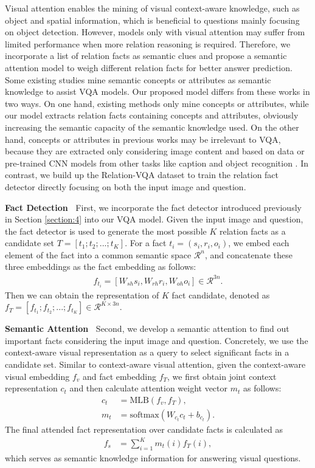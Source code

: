 \documentclass[sigconf]{acmart}
\begin{document}
Visual attention enables the mining of visual context-aware knowledge, such as object and spatial information, which is beneficial to questions mainly focusing on object detection. However, models only with visual attention may suffer from limited performance when more relation reasoning is required.
Therefore, we incorporate a list of relation facts as semantic clues and 
propose a semantic attention model to weigh different relation facts for better answer prediction. 
Some existing studies mine semantic concepts or attributes as semantic knowledge to assist VQA models. Our proposed model differs from these works in two ways. On one hand, existing methods only mine concepts or attributes, while our model extracts relation facts containing concepts and attributes, obviously increasing the semantic capacity of the semantic knowledge used. On the other hand, concepts or attributes in previous works may be irrelevant to VQA, because they are extracted only considering image content and based on data or pre-trained CNN models from other tasks like caption and object recognition \cite{yu2017multi}. 
In contrast, we build up the Relation-VQA dataset to train the relation fact detector directly focusing on both the input image and question.

\textbf{Fact Detection~} First, we incorporate the fact detector introduced previously in Section \ref{section:4} into our VQA model. Given the input image and question, the fact detector is used to generate the most possible $K$ relation facts as a candidate set $T = [t_1; t_2; ...; t_K]$. For a fact $t_i = (s_i, r_i, o_i)$, we embed each element of the fact into a common semantic space $\mathcal{R}^n$, and concatenate these three embeddings as the fact embedding as follows:
\begin{align}
	f_{t_i} = [W_{sh}s_i, W_{rh}r_i, W_{oh}o_i] \in \mathcal{R}^{3n}. 
\end{align}
Then we can obtain the representation of $K$ fact candidate, denoted as $f_T = [f_{t_1}; f_{t_2}; ...; f_{t_K}] \in \mathcal{R}^{K\times3n}$.

\textbf{Semantic Attention~} Second, we develop a semantic attention to find out important facts considering the input image and question. Concretely, we use the context-aware visual representation as a query to select significant facts in a candidate set. Similar to context-aware visual attention, given the context-aware visual embedding $f_v$ and fact embedding $f_T$, we first obtain joint context representation $c_t$ and
then calculate attention weight vector $m_t$ as follows:	
\begin{align}
	c_t &= \mathrm{MLB}(f_v, f_T) , \label{eq:sem1} \\
	m_t &= \mathrm{softmax}(W_{c_t} c_t +b_{c_t}). \label{eq:sem2}
\end{align}
The final attended fact representation over candidate facts is calculated as
\begin{align}
	f_s	&= \sum_{i=1}^K m_t(i) f_T(i)  \label{eq:sem3},
\end{align}
which serves as semantic knowledge information for answering visual questions.
\end{document}
